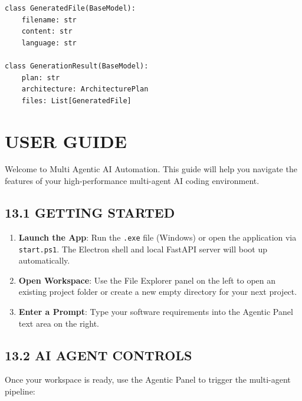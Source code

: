 \documentclass[
  12pt,
]{article}
\providecommand{\tightlist}{%
  \setlength{\itemsep}{0pt}\setlength{\parskip}{0pt}}
\begin{document}
\begin{verbatim}
class GeneratedFile(BaseModel):
    filename: str
    content: str
    language: str

class GenerationResult(BaseModel):
    plan: str
    architecture: ArchitecturePlan
    files: List[GeneratedFile]
\end{verbatim}

\newpage

\section{USER GUIDE}\label{user-guide}

Welcome to Multi Agentic AI Automation. This guide will help you
navigate the features of your high-performance multi-agent AI coding
environment.

\subsection{13.1 GETTING STARTED}\label{getting-started}

\begin{enumerate}
\def\labelenumi{\arabic{enumi}.}
\tightlist
\item
  \textbf{Launch the App}: Run the \texttt{.exe} file (Windows) or open
  the application via \texttt{start.ps1}. The Electron shell and local
  FastAPI server will boot up automatically.
\item
  \textbf{Open Workspace}: Use the File Explorer panel on the left to
  open an existing project folder or create a new empty directory for
  your next project.
\item
  \textbf{Enter a Prompt}: Type your software requirements into the
  Agentic Panel text area on the right.
\end{enumerate}

\subsection{13.2 AI AGENT CONTROLS}\label{ai-agent-controls}

Once your workspace is ready, use the Agentic Panel to trigger the
multi-agent pipeline:
\end{document}
